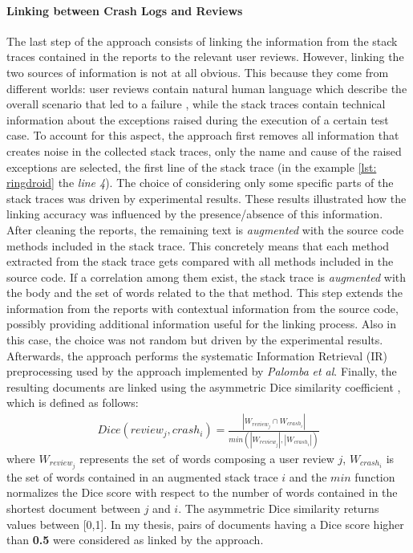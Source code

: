 \paragraph{Linking between Crash Logs and Reviews}
The last step of the approach consists of linking the information from the stack traces contained in the reports to the relevant user reviews. 
However, linking the two sources of information is not at all obvious.
This because they come from different worlds: user reviews contain natural human language which describe the overall scenario that led to a failure \cite{mernik}, while the stack traces contain technical information about the exceptions raised during the execution of a certain test case. 
To account for this aspect, the approach first removes all information that creates noise in the collected stack traces, only the name and cause of the raised exceptions are selected, \ie the first line of the stack trace (in the example \ref{lst: ringdroid} the \textit{line 4}). 
The choice of considering only some specific parts of the stack traces was driven by experimental results. 
These results illustrated how the linking accuracy was influenced by the presence/absence of this information. 
After cleaning the reports, the remaining text is \textit{augmented} with the source code methods included in the stack trace. 
This concretely means that each method extracted from the stack trace gets compared with all methods included in the source code. 
If a correlation among them exist, the stack trace is \textit{augmented} with the body and the set of words related to the that method. 
This step extends the information from the reports with contextual information from the source code, possibly providing additional information useful for the linking process. Also in this case, the choice was not random but driven by the experimental results.
Afterwards, the approach performs the systematic Information Retrieval (IR) preprocessing \cite{BaezaYates:1999} used by the approach implemented by \textit{Palomba} \textit{et al}. 
Finally, the resulting documents are linked using the asymmetric Dice similarity coefficient \cite{BaezaYates:1999}, which is defined as
follows: 
\begin{align*}
Dice (review_j, crash_i) = \frac{|W_{review_j} \cap W_{crash_i}|}{\textit{min}(|W_{review_j}|, |W_{crash_i}|)}
\end{align*}
where $W_{review_j}$ represents the set of words composing a user review $j$, $W_{crash_i}$ is the set of words contained in an augmented stack trace $i$ and the $min$ function normalizes the Dice score with respect to the number of words contained in the shortest document between $j$ and $i$. 
The asymmetric Dice similarity returns values between [0,1]. 
In my thesis, pairs of documents having a Dice score higher than \textbf{0.5} were considered as linked by the approach.






